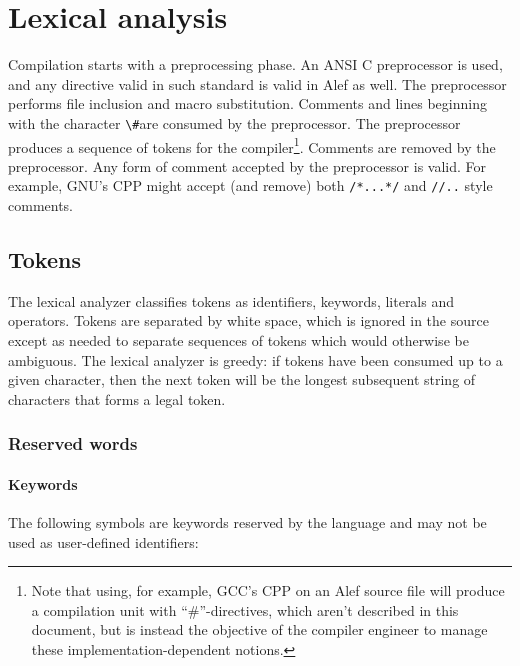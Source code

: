 \hypertarget{lexical-analysis}{%
\chapter{Lexical analysis}\label{lexical-analysis}}

Compilation starts with a preprocessing phase. An ANSI C preprocessor is
used, and any directive valid in such standard is valid in Alef as well.
The preprocessor performs file inclusion and macro substitution.
Comments and lines beginning with the character
\passthrough{\lstinline!\#!}are consumed by the preprocessor. The
preprocessor produces a sequence of tokens for the compiler\footnote{Note
  that using, for example, GCC's CPP on an Alef source file will produce
  a compilation unit with ``\#''-directives, which aren't described in
  this document, but is instead the objective of the compiler engineer
  to manage these implementation-dependent notions.}. Comments are
removed by the preprocessor. Any form of comment accepted by the
preprocessor is valid. For example, GNU's CPP might accept (and remove)
both \passthrough{\lstinline!/*...*/!} and
\passthrough{\lstinline!//..!} style comments.

\hypertarget{tokens}{%
\section{Tokens}\label{tokens}}

The lexical analyzer classifies tokens as identifiers, keywords,
literals and operators. Tokens are separated by white space, which is
ignored in the source except as needed to separate sequences of tokens
which would otherwise be ambiguous. The lexical analyzer is greedy: if
tokens have been consumed up to a given character, then the next token
will be the longest subsequent string of characters that forms a legal
token.

\hypertarget{reserved-words}{%
\subsection{Reserved words}\label{reserved-words}}

\hypertarget{keywords}{%
\subsubsection{Keywords}\label{keywords}}

The following symbols are keywords reserved by the language and may not
be used as user-defined identifiers:

